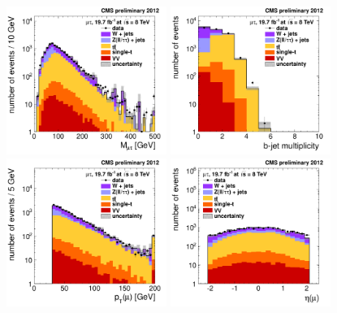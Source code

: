 \begin{figure}[hbtp]
  \begin{center}
    \includegraphics[width=0.465\textwidth]{figures/mutau/preselection/mass.pdf}
    \includegraphics[width=0.465\textwidth]{figures/mutau/preselection/nbjet.pdf} \\
    \includegraphics[width=0.465\textwidth]{figures/mutau/preselection/ptmu.pdf}
    \includegraphics[width=0.465\textwidth]{figures/mutau/preselection/etamu.pdf} \\

\end{center}
\end{figure}
